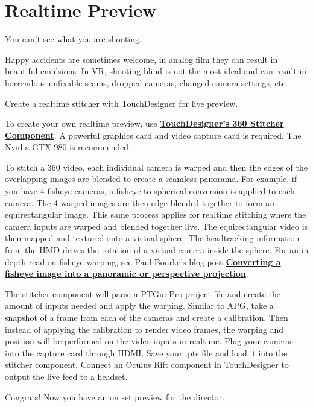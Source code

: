 \section{Realtime Preview}
\pagecolor{white}
\label{chap:11}
\begin{fullwidth}

\problem

{\large You can’t see what you are shooting. \par}


Happy accidents are sometimes welcome, in analog film they can result in beautiful emulsions. In VR, shooting blind is not the most ideal and can result in horrendous unfixable seams, dropped cameras, changed camera settings, etc. 


\solution

{\large Create a realtime stitcher with TouchDesigner for live preview. \par}

To create your own realtime preview, use \textbf{\href{https://www.derivative.ca/wiki088/index.php?title=Stitcher}{TouchDesigner’s 360 Stitcher Component}}. A powerful graphics card and video capture card is required. The Nvidia GTX 980 is recommended. 

To stitch a 360 video, each individual camera is warped and then the edges of the overlapping images are blended to create a seamless panorama. For example, if you have 4 fisheye cameras, a fisheye to spherical conversion is applied to each camera. The 4 warped images are then edge blended together to form an equirectangular image. This same process applies for realtime stitching where the camera inputs are warped and blended together live. The equirectangular video is then mapped and textured onto a virtual sphere. The headtracking information from the HMD drives the rotation of a virtual camera inside the sphere. For an in depth read on fisheye warping, see Paul Bourke's blog post \textbf{\href{http://paulbourke.net/dome/fish2/}{Converting a fisheye image into a panoramic or perspective projection}}.

The stitcher component will parse a PTGui Pro project file and create the amount of inputs needed and apply the warping. Similar to APG, take a snapshot of a frame from each of the cameras and create a calibration. Then instead of applying the calibration to render video frames, the warping and position will be performed on the video inputs in realtime. Plug your cameras into the capture card through HDMI. Save your .pts file and load it into the stitcher component. Connect an Oculus Rift component in TouchDesigner to output the live feed to a headset.

Congrats! Now you have an on set preview for the director.

\clearpage
\end{fullwidth}

